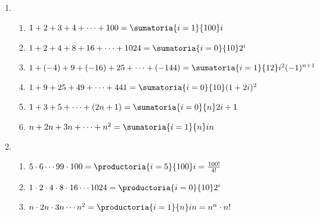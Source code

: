 \begin{enumerate}[label=\roman*)]
  \item
        \begin{enumerate}[label=\alph*)]
          \item  $
                  1 + 2 + 3 + 4 + \dots + 100 =
                  \sumatoria{i=1}{100}i
                $
          \item\label{ej1-2:item:i:b}
                $
                  1 + 2 + 4 + 8 + 16 + \dots + 1024 =
                  \sumatoria{i=0}{10}2^i
                $

          \item  $
                  1 + (-4) + 9 + (-16) + 25 + \dots + (-144) =
                  \sumatoria{i=1}{12}i^2(-1)^{n+1}
                $

          \item $
                  1 + 9 + 25 + 49 + \dots + 441 =
                  \sumatoria{i=0}{10}(1+2i)^2
                $

          \item $
                  1 + 3 + 5 + \dots + (2n + 1) =
                \sumatoria{i=0}{n} 2i+1
                $

          \item $
                  n + 2n + 3n + \dots + n^2 =
                  \sumatoria{i=1}{n} in
                $
        \end{enumerate}

  \item \begin{enumerate}[label=\alph*)]
          \item $5 \cdot 6 \cdots 99 \cdot 100 =
                  \productoria{i=5}{100}i = \frac{100!}{4!}
                $

          \item $
                  1 \cdot 2 \cdot 4 \cdot 8 \cdot 16 \cdots 1024 =
                  \productoria{i=0}{10}2^i
                $

          \item $
                  n \cdot 2n \cdot 3n \cdots n^2 =
                  \productoria{i=1}{n}in = n^n \cdot n!
                $
        \end{enumerate}
\end{enumerate}
